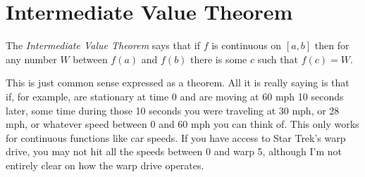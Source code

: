 \documentclass[fleqn]{exam}
\begin{document}

\section{Intermediate Value Theorem}
The {\em Intermediate Value Theorem} says that if $f$ is continuous on $[a, b]$ then for any number $W$ between $f(a)$ and
$f(b)$ there is some $c$ such that $f(c) = W$.  

This is just common sense expressed as a theorem.  All it is really saying is that if, for example, are stationary at
time 0 and are moving at 60 mph 10 seconds later, some time during those 10 seconds you were traveling at 30 mph, or 28
mph, or whatever speed between 0 and 60 mph you can think of.  This only works for continuous functions like car
speeds.  If you have access to Star Trek's warp drive, you may not hit all the speeds between 0 and warp 5, although I'm
not entirely clear on how the warp drive operates.
\end{document}
